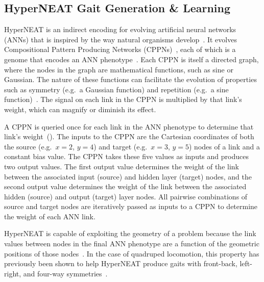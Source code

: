 \subsection{HyperNEAT Gait Generation \& Learning}
    
HyperNEAT is an indirect encoding for evolving artificial neural
networks (ANNs) that is inspired by the way natural organisms
develop~\citep{stanley2009hypercube}. It evolves Compositional Pattern
Producing Networks (CPPNs)~\citep{stanley2007compositional}, each of
which is a genome that encodes an ANN
phenotype~\citep{stanley2009hypercube}. Each CPPN is itself a directed
graph, where the nodes in the graph are mathematical functions, such as sine or
Gaussian. The nature of these functions can facilitate the evolution
of properties such as symmetry (e.g.\ a Gaussian function) and repetition (e.g.\ a sine
function)~\citep{stanley2009hypercube, stanley2007compositional}. The
signal on each link in the CPPN is multiplied by that link's weight,
which can magnify or diminish its effect.
  
A CPPN is queried once for each link in the ANN phenotype to determine
that link's weight~(). The inputs to the CPPN are the Cartesian
coordinates of both the source (e.g.\ $x = 2$, $y = 4$) and target
(e.g.\ $x = 3$, $y = 5$) nodes of a link and a constant bias
value. The CPPN takes these five values as inputs and produces two output values. The first output value
determines the weight of the link between the associated input
(source) and hidden layer (target) nodes, and the second output value
determines the weight of the link between the associated hidden
(source) and output (target) layer nodes. All pairwise combinations of
source and target nodes are iteratively passed as inputs to a CPPN to
determine the weight of each ANN link.


HyperNEAT is capable of exploiting the geometry of a problem because
the link values between nodes in the final ANN phenotype are a
function of the geometric positions of those nodes~\citep{stanley2009hypercube, clune2009sensitivity,
  clune2011performance}. In the case of quadruped locomotion, this
property has previously been shown to help HyperNEAT produce gaits with front-back, left-right,
and four-way symmetries~\citep{clune2009evolving,
  clune2011performance}.
  
